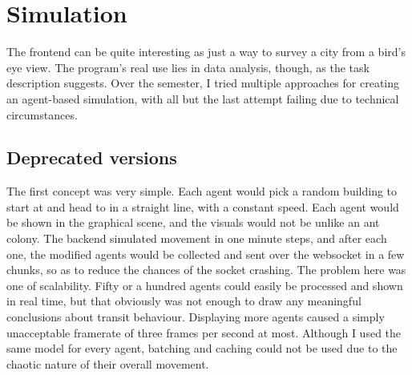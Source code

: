 \chapter{Simulation}

The frontend can be quite interesting as just a way to survey a city from a bird's eye view. The program's real use lies in data analysis, though, as the task description suggests. Over the semester, I tried multiple approaches for creating an agent-based simulation, with all but the last attempt failing due to technical circumstances.

\section{Deprecated versions}

The first concept was very simple. Each agent would pick a random building to start at and head to in a straight line, with a constant speed. Each agent would be shown in the graphical scene, and the visuals would not be unlike an ant colony. The backend simulated movement in one minute steps, and after each one, the modified agents would be collected and sent over the websocket in a few chunks, so as to reduce the chances of the socket crashing. The problem here was one of scalability. Fifty or a hundred agents could easily be processed and shown in real time, but that obviously was not enough to draw any meaningful conclusions about transit behaviour. Displaying more agents caused a simply unacceptable framerate of three frames per second at most. Although I used the same model for every agent, batching and caching could not be used due to the chaotic nature of their overall movement.

